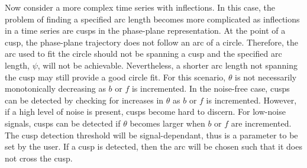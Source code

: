 \documentclass[a4paper]{IEEEtran}
\begin{document}
Now consider a more complex time series with inflections. In this case, the problem of finding a specified arc length becomes more complicated as inflections in a time series are cusps in the phase-plane representation. At the point of a cusp, the phase-plane trajectory does not follow an arc of a circle. Therefore, the arc used to fit the circle should not be spanning a cusp and the specified arc length, $\psi$, will not be achievable. Nevertheless, a shorter arc length not spanning the cusp may still provide a good circle fit. For this scenario, $\theta$ is not necessarily monotonically decreasing as $b$ or $f$ is incremented. In the noise-free case, cusps can be detected by checking for increases in $\theta$ as $b$ or $f$ is incremented. However, if a high level of noise is present, cusps become hard to discern. For low-noise signals, cusps can be detected if $\theta$ becomes larger when $b$ or $f$ are incremented. The cusp detection threshold will be signal-dependant, thus is a  parameter to be set by the user. If a cusp is detected, then the arc will be chosen such that it does not cross the cusp.
 

 


\end{document}
